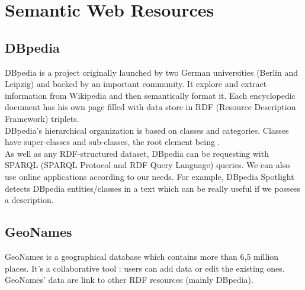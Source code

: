 
\chapter{Semantic Web Resources} %

\label{chapter:SemanticWebResources} %



\section{DBpedia}

DBpedia is a project originally launched by two German universities (Berlin and Leipzig) and backed by an important community. It explore and extract information from Wikipedia and then semantically format it. Each encyclopedic document has his own page filled with data store in RDF (Resource Description Framework) triplets.\\

DBpedia's hierarchical organization is based on classes and categories. Classes have super-classes and sub-classes, the root element being .\\

As well as any RDF-structured dataset, DBpedia can be requesting with SPARQL (SPARQL Protocol and RDF Query Language) queries. We can also use online applications according to our needs. For example, DBpedia Spotlight detects DBpedia entities/classes in a text which can be really useful if we possess a description.


\section{GeoNames}

GeoNames is a geographical database which contains more than 6,5 million places. It's a collaborative tool : users can add data or edit the existing ones. GeoNames' data are link to other RDF resources (mainly DBpedia). \\

